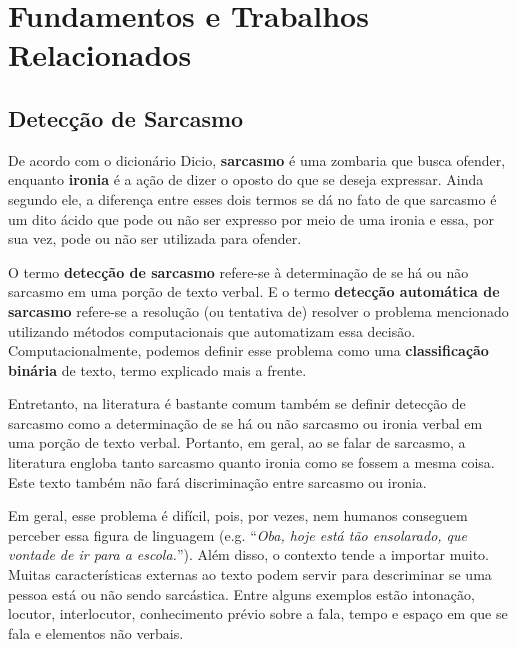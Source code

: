 

\chapter{Fundamentos e Trabalhos Relacionados}%
\label{cha:fundamentos_e_trabalhos_relacionados}

\section{Detecção de Sarcasmo}%
\label{sec:deteccao_de_sarcasmo}

De acordo com o dicionário Dicio, \textbf{sarcasmo} é uma zombaria que busca
ofender, enquanto \textbf{ironia} é a ação de dizer o oposto do que se deseja
expressar. Ainda segundo ele, a diferença entre esses dois termos se dá no fato
de que sarcasmo é um dito ácido que pode ou não ser expresso por meio de uma
ironia e essa, por sua vez, pode ou não ser utilizada para
ofender.~\cite{dicio_sarc, dicio_irony}

O termo \textbf{detecção de sarcasmo} refere-se à determinação de se há ou não
sarcasmo em uma porção de texto verbal. E o termo \textbf{detecção automática de
sarcasmo} refere-se a resolução (ou tentativa de) resolver o problema mencionado
utilizando métodos computacionais que automatizam essa decisão.
Computacionalmente, podemos definir esse problema como uma \textbf{classificação
binária} de texto, termo explicado mais a frente.

Entretanto, na literatura é bastante comum também se definir detecção de
sarcasmo como a determinação de se há ou não sarcasmo ou ironia verbal em uma
porção de texto verbal. Portanto, em geral, ao se falar de sarcasmo, a
literatura engloba tanto sarcasmo quanto ironia como se fossem a mesma coisa.
Este texto também não fará discriminação entre sarcasmo ou ironia.

Em geral, esse problema é difícil, pois, por vezes, nem humanos conseguem
perceber essa figura de linguagem (e.g. ``\textit{Oba, hoje está tão ensolarado,
que vontade de ir para a escola.}''). Além disso, o contexto tende a importar
muito. Muitas características externas ao texto podem servir para descriminar se
uma pessoa está ou não sendo sarcástica. Entre alguns exemplos estão intonação,
locutor, interlocutor, conhecimento prévio sobre a fala, tempo e espaço em que
se fala e elementos não verbais.~\cite{wallace-etal:2014:ironic-context}


